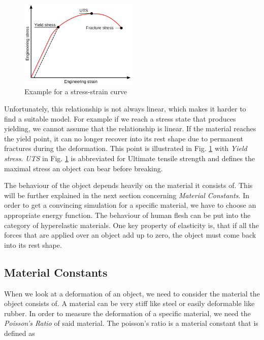 \begin{figure}[!htbp]
	\centering
	\includegraphics[width=0.5\textwidth]{resources/stress_strain_curve.png}
	\caption[Stress-strain curve]{Example for a stress-strain curve\footnotemark}
	\label{fig:stress_strain}
\end{figure}

Unfortunately, this relationship is not always linear, which makes it harder to find a suitable model. For example if we reach a stress state that produces yielding, we cannot assume that the relationship is linear. If the material reaches the yield point, it can no longer recover into its rest shape due to permanent fractures during the deformation. This point is illustrated in Fig. \ref{fig:stress_strain} with \textit{Yield stress}. \textit{UTS} in Fig. \ref{fig:stress_strain} is abbreviated for Ultimate tensile strength and defines the maximal stress an object can bear before breaking. 

The behaviour of the object depends heavily on the material it consists of. This will be further explained in the next section concerning \textit{Material Constants}. In order to get a convincing simulation for a specific material, we have to choose an appropriate energy function. The behaviour of human flesh can be put into the category of hyperelastic materials. One key property of elasticity is, that if all the forces that are applied over an object add up to zero, the object must come back into its rest shape.


\subsection{Material Constants}
When we look at a deformation of an object, we need to consider the material the object consists of. A material can be very stiff like steel or easily deformable like rubber. In order to measure the deformation of a specific material, we need the \textit{Poisson's Ratio} of said material. The poisson's ratio is a material constant that is defined as 

